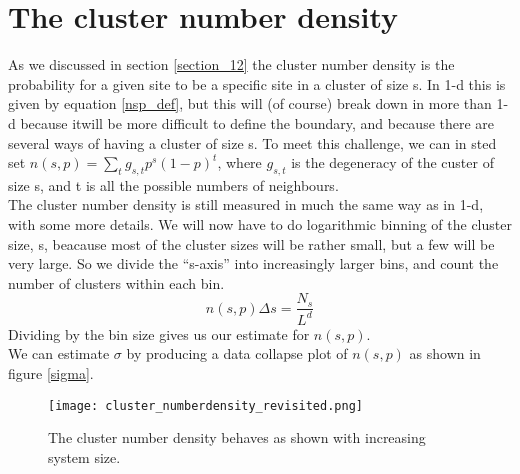 \documentclass[a4paper,english, 10pt, twoside]{article}
\begin{document}
\section{The cluster number density}
As we discussed in section \ref{section_12} the cluster number density is the probability for a given site to be a specific 
site in a cluster of size s. In 1-d this is given by equation \ref{nsp_def}, but this will (of course) break down in more than 
1-d because itwill be more difficult to define the boundary, and because there are several ways of having a cluster of size s. 
To meet this challenge, we can in sted set $n(s,p) = \sum\limits_t g_{s,t}p^s(1-p)^t$, where $g_{s,t}$ is the degeneracy of the 
custer of size s, and t is all the possible numbers of neighbours.\\
The cluster number density is still measured in much the same way as in 1-d, with some more details. We will now have to do 
logarithmic binning of the cluster size, s, beacause most of the cluster sizes will be rather small, but a few will be very large. 
So we divide the ``s-axis'' into increasingly larger bins, and count the number of clusters within each bin.
$$
n(s,p)\Delta s = \frac{N_s}{L^d}
$$
Dividing by the bin size gives us our estimate for $n(s,p)$.\\
We can estimate $\sigma$ by producing a data collapse plot of $n(s,p)$ as shown in figure \ref{sigma}.

\begin{figure}[H]
 \centering
 \texttt{[image: cluster\_numberdensity\_revisited.png]}
 \caption{The cluster number density behaves as shown with increasing system size.}
\end{figure}
\end{document}
